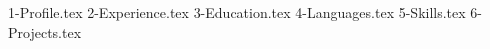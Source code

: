 \documentclass[margin]{res}
\let\orighref\href
\renewcommand{\href}[2]{\orighref{#1}{#2\,\faExternalLink}}
\begin{document}
    \address{\\ Email \qquad : \href{mailto:louiszhenyean@gmail.com}{louiszhenyean@gmail.com} \vspace{0.1cm}
             \\ LinkedIn \ \ : \url{https://www.linkedin.com/in/zhenyean} \\ \\}
    \address{
    \\ Whatsapp/Telegram : (+60) 19-567 5808 \\ \\}
    
    \begin{resume}\vspace{0.2cm}
        {1-Profile.tex} 
        {2-Experience.tex}
        {3-Education.tex} 
        {4-Languages.tex} \clearpage
        {5-Skills.tex} 
        {6-Projects.tex} 
    \end{resume}
\(\)
\end{document}
